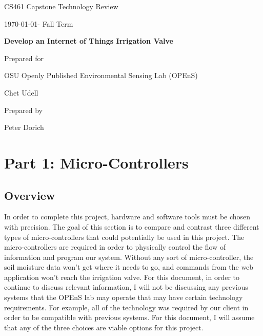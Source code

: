 \documentclass[onecolumn, draftclsnofoot,10pt, compsoc]{IEEEtran}
\def \CapstoneTeamNumber{		35}
\def \GroupMemberOne{			Peter Dorich}
\def \CapstoneProjectName{		Develop an Internet of Things Irrigation Valve}
\def \CapstoneSponsorCompany{	 	OSU \textbar Openly Published Environmental Sensing Lab (OPEnS) }
\def \CapstoneSponsorPerson{		Chet Udell}
\def \DocType{		Technology Review
}
\newcommand{\NameSigPair}[1]{\par
	\makebox[2.75in][r]{#1} \hfil 	\makebox[3.25in]{\makebox[2.25in]{\hrulefill} \hfill		\makebox[.75in]{\hrulefill}}
	\par\vspace{-12pt} \textit{\tiny\noindent
		\makebox[2.75in]{} \hfil		\makebox[3.25in]{\makebox[2.25in][r]{Signature} \hfill	\makebox[.75in][r]{Date}}}}
\renewcommand{\NameSigPair}[1]{#1}
\begin{document}
	\begin{titlepage}
		\begin{singlespace}
			\hfill 
			\par\vspace{.2in}
			\centering
			\scshape{
				\huge CS461 Capstone \DocType \par
				{\large\today - Fall Term}\par
				\vspace{.5in}
				\textbf{\Huge\CapstoneProjectName}\par
				\vfill
				{\large Prepared for}\par
				\Huge \CapstoneSponsorCompany\par
				\vspace{5pt}
				{\Large\NameSigPair{\CapstoneSponsorPerson}\par}
				{\large Prepared by }\par


				\vspace{5pt}
				{\Large
					\NameSigPair{\GroupMemberOne}\par
	
				}

				\vspace{20pt}
			}    
		\end{singlespace}
	\end{titlepage}
	\newpage
	\tableofcontents
	
    
	\clearpage
	\section{Part 1: Micro-Controllers}
	
	
	\subsection{Overview}
    In order to complete this project, hardware and software tools must be chosen with precision. 
    The goal of this section is to compare and contrast three different types of micro-controllers that could potentially be used in this project.
    The micro-controllers are required in order to physically control the flow of information and program our system.
    Without any sort of micro-controller, the soil moisture data won't get where it needs to go, and commands from the web application won't reach the irrigation valve.
    For this document, in order to continue to discuss relevant information, I will not be discussing any previous systems that the OPEnS lab may operate that may have certain technology requirements. 
    For example, all of the technology was required by our client in order to be compatible with previous systems. 
    For this document, I will assume that any of the three choices are viable options for this project. 
    
\end{document}
